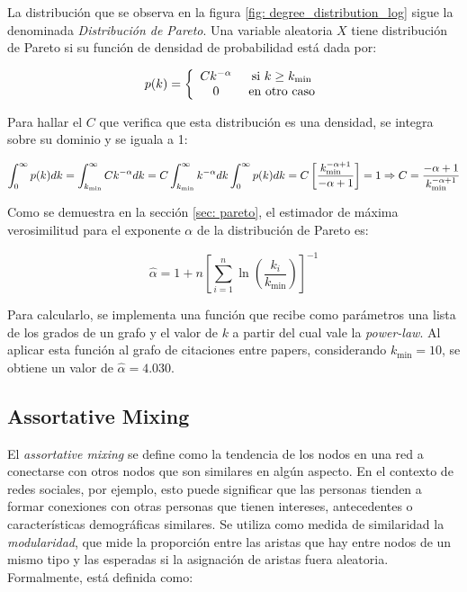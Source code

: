 \documentclass{article}
\begin{document}
La distribución que se observa en la figura \ref{fig: degree_distribution_log} sigue la denominada \textit{Distribución de Pareto}. Una variable aleatoria $X$ tiene distribución de Pareto si su función de densidad de probabilidad está dada por:

\begin{equation}
    \label{eq:pareto}
    p(k) = \left\lbrace \begin{array}{c c} C k^{-\alpha} & \text{ si } k\geq k_\text{min} \\ 0 & \text{ en otro caso} \end{array}\right.
\end{equation}



Para hallar el $C$ que verifica que esta distribución es una densidad, se integra sobre su dominio y se iguala a 1:

$$
    \int_{0}^{\infty} p(k) dk = \int_{k_{\text{min}}}^{\infty} C k^{-\alpha} dk = C \int_{k_{\text{min}}}^{\infty} k^{-\alpha}dk \\
    \int_{0}^{\infty} p(k) dk = C \left[ \frac{k_{\text{min}}^{-\alpha+1}}{-\alpha+1} \right] = 1 \\
    \Rightarrow C = \frac{-\alpha+1}{k_{\text{min}}^{-\alpha+1}}
$$



Como se demuestra en la sección \ref{sec: pareto}, el estimador de máxima verosimilitud para el exponente $\alpha$ de la distribución de Pareto es:

\begin{equation}
    \label{eq: alpha_pareto}
    \hat{\alpha} = 1 + n \left[ \sum_{i=1}^{n} \ln\left(\frac{k_i}{k_{\text{min}}}\right) \right]^{-1}
\end{equation}


Para calcularlo, se implementa una función que recibe como parámetros una lista de los grados de un grafo y el valor de $k$ a partir del cual vale la \textit{power-law}. Al aplicar esta función al grafo de citaciones entre papers, considerando $k_{\text{min}} = 10$, se obtiene un valor de $\hat{\alpha} = 4.030$.

\subsection{Assortative Mixing}


El \textit{assortative mixing} se define como la tendencia de los nodos en una red a conectarse con otros nodos que son similares en algún aspecto. En el contexto de redes sociales, por ejemplo, esto puede significar que las personas tienden a formar conexiones con otras personas que tienen intereses, antecedentes o características demográficas similares. Se utiliza como medida de similaridad la \textit{modularidad}, que mide la proporción entre las aristas que hay entre nodos de un mismo tipo y las esperadas si la asignación de aristas fuera aleatoria. Formalmente, está definida como:
\end{document}
